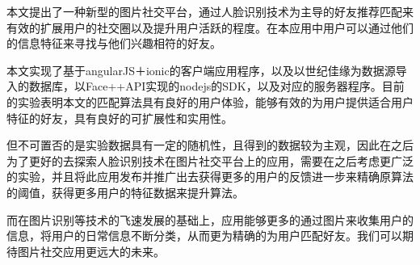

本文提出了一种新型的图片社交平台，通过人脸识别技术为主导的好友推荐匹配来有效的扩展用户的社交圈以及提升用户活跃的程度。在本应用中用户可以通过他们的信息特征来寻找与他们兴趣相符的好友。

本文实现了基于angularJS＋ionic的客户端应用程序，以及以世纪佳缘为数据源导入的数据库，以Face++API实现的nodejs的SDK，以及对应的服务器程序。目前的实验表明本文的匹配算法具有良好的用户体验，能够有效的为用户提供适合用户特征的好友，具有良好的可扩展性和实用性。

但不可置否的是实验数据具有一定的随机性，且得到的数据较为主观，因此在之后为了更好的去探索人脸识别技术在图片社交平台上的应用，需要在之后考虑更广泛的实验，并且将此应用发布并推广出去获得更多的用户的反馈进一步来精确原算法的阈值，获得更多用户的特征数据来提升算法。

而在图片识别等技术的飞速发展的基础上，应用能够更多的通过图片来收集用户的信息，将用户的日常信息不断分类，从而更为精确的为用户匹配好友。我们可以期待图片社交应用更远大的未来。



